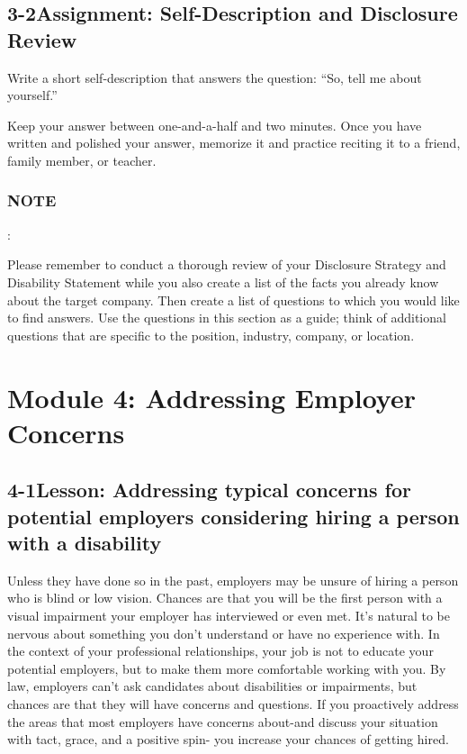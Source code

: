 \pagebreak \subsection*{3-2\quad Assignment: Self-Description and Disclosure Review}
Write a short self-description that answers the question: ``So, tell me about yourself.''

Keep your answer between one-and-a-half and two minutes. Once you have written and polished your answer, memorize it and practice reciting it to a friend, family member, or teacher.

\subsubsection*{NOTE}:

Please remember to conduct a thorough review of your Disclosure Strategy and Disability Statement while you also create a list of the facts you already know about the target company. Then create a list of questions to which you would like to find answers. Use the questions in this section as a guide; think of additional questions that are specific to the position, industry, company, or location.

\pagebreak \section*{Module 4:	Addressing Employer Concerns}
\noindent\makebox[\textwidth]{\rule{\linewidth}{0.4pt}}  \localtableofcontents
\noindent\makebox[\textwidth]{\rule{\linewidth}{0.4pt}}


\pagebreak \subsection*{4-1\quad Lesson: Addressing typical concerns for potential employers considering hiring a person with a disability}

Unless they have done so in the past, employers may be unsure of hiring a person who is blind or low vision. Chances are that you will be the first person with a visual impairment your employer has interviewed or even met. It's natural to be nervous about something you don't understand or have no experience with. In the context of your professional relationships, your job is not to educate your potential employers, but to make them more comfortable working with you. By law, employers can't ask candidates about disabilities or impairments, but chances are that they will have concerns and questions. If you proactively address the areas that most employers have concerns about-and discuss your situation with tact, grace, and a positive spin- you increase your chances of getting hired.

